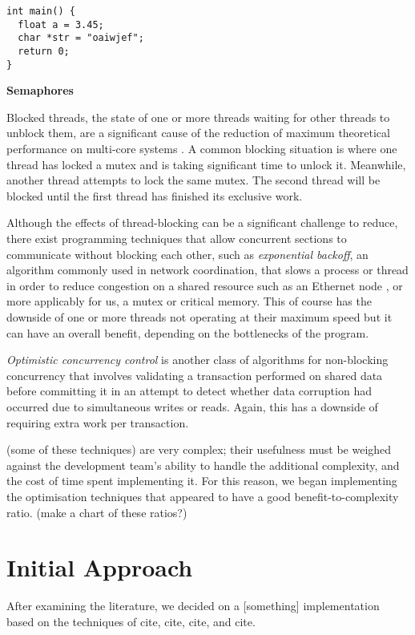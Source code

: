 \documentclass[11pt, a4paper, twocolumn]{article}
\begin{document}
\begin{verbatim}
int main() {
  float a = 3.45;
  char *str = "oaiwjef";
  return 0;
}
\end{verbatim}

\textbf{Semaphores}

Blocked threads, the state of one or more threads waiting for other threads to unblock them, are a significant cause of the reduction of maximum theoretical performance on multi-core systems \citep{Alemany1992}. A common blocking situation is where one thread has locked a mutex and is taking significant time to unlock it. Meanwhile, another thread attempts to lock the same mutex. The second thread will be blocked until the first thread has finished its exclusive work.

Although the effects of thread-blocking can be a significant challenge to reduce, there exist programming techniques that allow concurrent sections to communicate without blocking each other, such as \emph{exponential backoff}, an algorithm commonly used in network coordination, that slows a process or thread in order to reduce congestion on a shared resource such as an Ethernet node \citep{Goodman2019}, or more applicably for us, a mutex or critical memory. This of course has the downside of one or more threads not operating at their maximum speed but it can have an overall benefit, depending on the bottlenecks of the program.

\emph{Optimistic concurrency control} is another class of algorithms for non-blocking concurrency that involves validating a transaction performed on shared data before committing it \citep{Herlihy1993} in an attempt to detect whether data corruption had occurred due to simultaneous writes or reads. Again, this has a downside of requiring extra work per transaction.

(some of these techniques) are very complex; their usefulness must be weighed against the development team's ability to handle the additional complexity, and the cost of time spent implementing it. For this reason, we began implementing the optimisation techniques that appeared to have a good benefit-to-complexity ratio. (make a chart of these ratios?)


\section{Initial Approach}

After examining the literature, we decided on a [something] implementation based on the techniques of cite, cite, cite, and cite.






\end{document}
